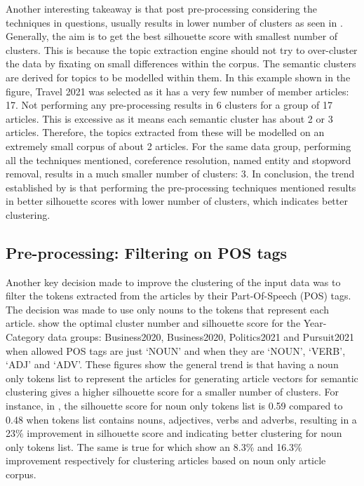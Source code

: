 Another interesting takeaway is that post pre-processing considering the techniques in questions, usually results in lower number of clusters as seen in . Generally, the aim is to get the best silhouette score with smallest number of clusters. This is because the topic extraction engine should not try to over-cluster the data by fixating on small differences within the corpus. The semantic clusters are derived for topics to be modelled within them. In this example shown in the figure, Travel 2021 was selected as it has a very few number of member articles: 17. Not performing any pre-processing results in 6 clusters for a group of 17 articles. This is excessive as it means each semantic cluster has about 2 or 3 articles. Therefore, the topics extracted from these will be modelled on an extremely small corpus of about 2 articles. For the same data group, performing all the techniques mentioned, coreference resolution, named entity and stopword removal, results in a much smaller number of clusters: 3. In conclusion, the trend established by  is that performing the pre-processing techniques mentioned results in better silhouette scores with lower number of clusters, which indicates better clustering. 


\subsection{Pre-processing: Filtering on POS tags} \label{s:pos_clustering}
Another key decision made to improve the clustering of the input data was to filter the tokens extracted from the articles by their Part-Of-Speech (POS) tags. The decision was made to use only nouns to the tokens that represent each article.  show the optimal cluster number and silhouette score for the Year-Category data groups: Business2020, Business2020, Politics2021 and Pursuit2021 when allowed POS tags are just `NOUN' and when they are `NOUN', `VERB', `ADJ' and `ADV'. These figures show the general trend is that having a noun only tokens list to represent the articles for generating article vectors for semantic clustering gives a higher silhouette score for a smaller number of clusters. For instance, in , the silhouette score for noun only tokens list is 0.59 compared to 0.48 when tokens list contains nouns, adjectives, verbs and adverbs, resulting in a 23\% improvement in silhouette score and indicating better clustering for noun only tokens list. The same is true for  which show an 8.3\% and 16.3\% improvement respectively for clustering articles based on noun only article corpus.


